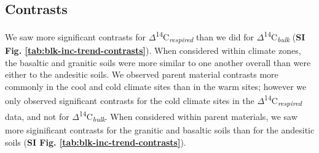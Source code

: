 \documentclass[english,man,floatsintext]{apa6}
\begin{document}
\hypertarget{contrasts}{%
\subsection{Contrasts}\label{contrasts}}

We saw more significant contrasts for \(\Delta\)\textsuperscript{14}C\textsubscript{\emph{respired}} than we did for \(\Delta\)\textsuperscript{14}C\textsubscript{\emph{bulk}} (\textbf{SI Fig. \ref{tab:blk-inc-trend-contrasts}}). When considered within climate zones, the basaltic and granitic soils were more similar to one another overall than were either to the andesitic soils. We observed parent material contrasts more commonly in the cool and cold climate sites than in the warm sites; however we only observed significant contrasts for the cold climate sites in the \(\Delta\)\textsuperscript{14}C\textsubscript{\emph{respired}} data, and not for \(\Delta\)\textsuperscript{14}C\textsubscript{\emph{bulk}}. When considered within parent materials, we saw more siginificant contrasts for the granitic and basaltic soils than for the andesitic soils (\textbf{SI Fig. \ref{tab:blk-inc-trend-contrasts}}).



\begingroup\fontsize{10}{12}\selectfont
\end{document}
